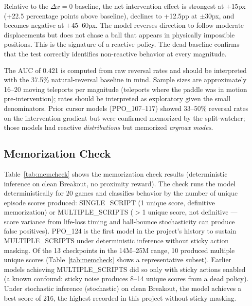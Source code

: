 \documentclass[11pt]{article}
\begin{document}
Relative to the $\Delta x=0$ baseline, the net intervention effect is strongest
at $\pm$15px (+22.5 percentage points above baseline), declines to
+12.5pp at $\pm$30px, and becomes negative at $\pm$45--60px. The model
reverses direction to follow moderate displacements but does not chase a ball
that appears in physically impossible positions. This is the signature of a
reactive policy. The dead baseline confirms that the test correctly identifies
non-reactive behavior at every magnitude.

The AUC of 0.421 is computed from raw reversal rates and should be interpreted
with the 37.5\% natural-reversal baseline in mind. Sample sizes are
approximately 16--20 moving teleports per magnitude (teleports where the paddle
was in motion pre-intervention); rates should be interpreted as exploratory
given the small denominators. Prior cursor models (PPO\_107--117)
showed 33--50\% reversal rates on the intervention gradient but were confirmed
memorized by the split-watcher; those models had reactive \emph{distributions}
but memorized \emph{argmax modes}.

\subsection{Memorization Check}

Table~\ref{tab:memcheck} shows the memorization check results (deterministic
inference on clean Breakout, no proximity reward). The check runs the model
deterministically for 20 games and classifies behavior by the number of
unique episode scores produced: SINGLE\_SCRIPT (1 unique score, definitive
memorization) or MULTIPLE\_SCRIPTS ($>$1 unique score, not definitive — score
variance from life-loss timing and ball-bounce stochasticity can produce
false positives). PPO\_124 is the first model in the project's history to
sustain MULTIPLE\_SCRIPTS under deterministic inference without
sticky action masking. Of the 13 checkpoints in the 14M--25M range, 10
produced multiple unique scores (Table~\ref{tab:memcheck} shows a
representative subset). Earlier models achieving MULTIPLE\_SCRIPTS
did so only with sticky actions enabled (a known confound: sticky noise
produces 8--14 unique scores from a dead policy). Under stochastic inference
(stochastic) on clean Breakout, the model achieves a best score of 216, the
highest recorded in this project without sticky masking.
\end{document}
